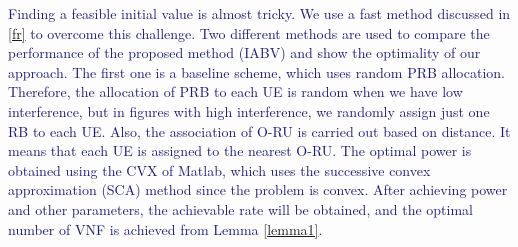 \documentclass[lettersize,journal]{IEEEtran}
\begin{document}
\begin{table}[H]
 \caption {Simulation Parameters} \label{table:1a}
 \begin{center}
 \end{center}
 \end{table}
 
\textcolor{MidnightBlue}{Finding a feasible initial value is almost tricky. We use a fast method discussed in \ref{fr} to overcome this challenge. 
Two different methods are used to compare the performance of the proposed method (IABV) and show the optimality of our approach.
The first one is a baseline scheme, which uses random PRB allocation. Therefore, the allocation of PRB to each UE is random when we have low interference, but in figures with high interference, we randomly assign just one RB to each UE. Also, the association of O-RU is carried out based on distance. It means that each UE is assigned to the nearest O-RU. The optimal power is obtained using the CVX of Matlab, which uses the successive convex approximation (SCA) method since the problem is convex.
After achieving power and other parameters, the achievable rate will be obtained, and the optimal number of VNF is achieved from Lemma \eqref{lemma1}.}
\end{document}
